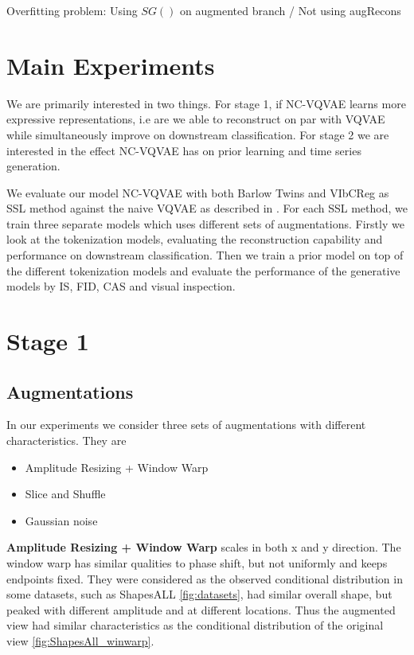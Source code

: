 \documentclass[../../thesis.tex]{subfiles}
\begin{document}
Overfitting problem: Using $SG()$ on augmented branch / Not using augRecons \newline

\section{Main Experiments}

We are primarily interested in two things. For stage 1, if NC-VQVAE learns more expressive representations, i.e are we able to reconstruct on par with VQVAE while simultaneously improve on downstream classification. For stage 2 we are interested in the effect NC-VQVAE has on prior learning and time series generation. \newline

We evaluate our model NC-VQVAE with both Barlow Twins and VIbCReg as SSL method against the naive VQVAE as described in \cite{TimeVQVAE}. For each SSL method, we train three separate models which uses different sets of augmentations. Firstly we look at the tokenization models, evaluating the reconstruction capability and performance on downstream classification. Then we train a prior model on top of the different tokenization models and evaluate the performance of the generative models by IS, FID, CAS and visual inspection.\newline


\section{Stage 1}

\subsection{Augmentations}
In our experiments we consider three sets of augmentations with different characteristics. They are
\begin{itemize}
    \item Amplitude Resizing + Window Warp
    \item Slice and Shuffle
    \item Gaussian noise
\end{itemize}

\textbf{Amplitude Resizing + Window Warp} scales in both x and y direction. The window warp has similar qualities to phase shift, but not uniformly and keeps endpoints fixed. They were considered as the observed conditional distribution in some datasets, such as ShapesALL \ref{fig:datasets}, had similar overall shape, but peaked with different amplitude and at different locations. Thus the augmented view had similar characteristics as the conditional distribution of the original view \ref{fig:ShapesAll_winwarp}. \newline
\end{document}

